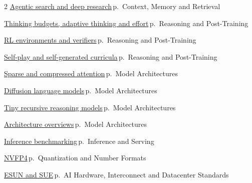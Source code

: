 \documentclass[10pt,a4paper,openany]{report}
\begin{document}
\begin{multicols}{2}
\hyperref[c:context-6]{Agentic search and deep research}\,{\color{muted}\scriptsize p.\,\pageref{c:context-6}} {\color{muted}\scriptsize Context, Memory and Retrieval}\par\vspace{2pt}
\hyperref[c:reasoning-1]{Thinking budgets, adaptive thinking and effort}\,{\color{muted}\scriptsize p.\,\pageref{c:reasoning-1}} {\color{muted}\scriptsize Reasoning and Post-Training}\par\vspace{2pt}
\hyperref[c:reasoning-5]{RL environments and verifiers}\,{\color{muted}\scriptsize p.\,\pageref{c:reasoning-5}} {\color{muted}\scriptsize Reasoning and Post-Training}\par\vspace{2pt}
\hyperref[c:reasoning-10]{Self-play and self-generated curricula}\,{\color{muted}\scriptsize p.\,\pageref{c:reasoning-10}} {\color{muted}\scriptsize Reasoning and Post-Training}\par\vspace{2pt}
\hyperref[c:arch-2]{Sparse and compressed attention}\,{\color{muted}\scriptsize p.\,\pageref{c:arch-2}} {\color{muted}\scriptsize Model Architectures}\par\vspace{2pt}
\hyperref[c:arch-5]{Diffusion language models}\,{\color{muted}\scriptsize p.\,\pageref{c:arch-5}} {\color{muted}\scriptsize Model Architectures}\par\vspace{2pt}
\hyperref[c:arch-10]{Tiny recursive reasoning models}\,{\color{muted}\scriptsize p.\,\pageref{c:arch-10}} {\color{muted}\scriptsize Model Architectures}\par\vspace{2pt}
\hyperref[c:arch-12]{Architecture overviews}\,{\color{muted}\scriptsize p.\,\pageref{c:arch-12}} {\color{muted}\scriptsize Model Architectures}\par\vspace{2pt}
\hyperref[c:inference-8]{Inference benchmarking}\,{\color{muted}\scriptsize p.\,\pageref{c:inference-8}} {\color{muted}\scriptsize Inference and Serving}\par\vspace{2pt}
\hyperref[c:quant-1]{NVFP4}\,{\color{muted}\scriptsize p.\,\pageref{c:quant-1}} {\color{muted}\scriptsize Quantization and Number Formats}\par\vspace{2pt}
\hyperref[c:hardware-4]{ESUN and SUE}\,{\color{muted}\scriptsize p.\,\pageref{c:hardware-4}} {\color{muted}\scriptsize AI Hardware, Interconnect and Datacenter Standards}\par\vspace{2pt}

\end{multicols}
\end{document}

